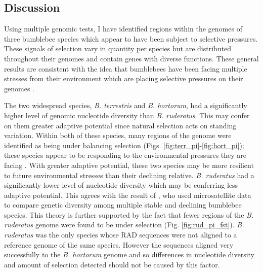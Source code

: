 \documentclass[12pt]{article}
\begin{document}
\begin{linenumbers}
		
		
   		
    \section{Discussion}
    
    

		Using multiple genomic tests, I have identified regions within the genomes of three bumblebee species which appear to have been subject to selective pressures. These signals of selection vary in 
    	quantity per species but are distributed throughout their genomes and contain genes with diverse functions. These general results are consistent with the idea that bumblebees have been facing multiple stresses from their environment which are placing selective pressures on their genomes \citep{potts_global_2010, outhwaite_agriculture_2022}. 
    	
    	
    	The two widespread species, \emph{B. terrestris} and \emph{B. hortorum}, had a significantly higher level of genomic nucleotide diversity than \emph{B. ruderatus}. This may confer on them greater adaptive potential since natural selection acts on standing variation. Within both of these species, many regions of the genome were identified as being under balancing selection (Figs. \ref{fig:terr_pi}-\ref{fig:hort_pi}); these species appear to be responding to the environmental pressures they are facing \citep{colgan_genomic_2022}.
    	With greater adaptive potential, these two species may be more resilient to future environmental stresses than their declining relative.
    	\emph{B. ruderatus} had a significantly lower level of nucleotide diversity which may be conferring less adaptive potential. This agrees with the result of \cite{maebe_microsatellite_2015}, who used microsatellite data to compare genetic diversity among multiple stable and declining bumblebee species. This theory is further supported by the fact that fewer regions of the \emph{B. ruderatus} genome were found to be under selection (Fig. \ref{fig:rud_pi_fst}). 
		\emph{B. ruderatus} was the only species whose RAD sequences were not aligned to a reference genome of the same species. However the sequences aligned very successfully to the \emph{B. hortorum} genome and so differences in nucleotide diversity and amount of selection  detected should not be caused by this factor.
    	

\end{linenumbers}
\end{document}
